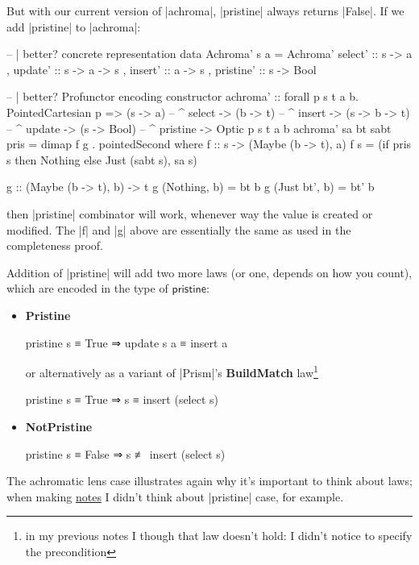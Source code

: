 \documentclass{article}
\begin{document}
But with our current version of |achroma|, |pristine| always returns |False|.
If we add |pristine| to |achroma|:

\begin{code}
-- | better? concrete representation
data Achroma' s a = Achroma'
    { select'   :: s -> a
    , update'   :: s -> a -> s
    , insert'   :: a -> s
    , pristine' :: s -> Bool
    }

-- | better? Profunctor encoding constructor
achroma'
    :: forall p s t a b. PointedCartesian p
    => (s -> a)       -- ^ select
    -> (b -> t)       -- ^ insert
    -> (s -> b -> t)  -- ^ update
    -> (s -> Bool)    -- ^ pristine
    -> Optic p s t a b
achroma' sa bt sabt pris
    = dimap f g
    . pointedSecond
  where
    f :: s -> (Maybe (b -> t), a)
    f s = (if pris s then Nothing else Just (sabt s), sa s)

    g :: (Maybe (b -> t), b) -> t
    g (Nothing,  b) = bt b
    g (Just bt', b) = bt' b
\end{code}

then |pristine| combinator will work, whenever way the value is created or modified.
The |f| and |g| above are essentially the same as used in the completeness proof.

Addition of |pristine| will add two more laws (or one, depends on how you count),
which are encoded in the type of $\mathsf{pristine}$:

\begin{itemize}
\item \textbf{Pristine}
\begin{code}
pristine s ≡ True ⇒ update s a ≡ insert a
\end{code}

or alternatively as a variant of |Prism|'s \textbf{BuildMatch} law\footnote{
in my previous notes I though that law doesn't hold: I didn't notice to specify the precondition}

\begin{code}
 pristine s ≡ True ⇒ s ≡ insert (select s)
\end{code}

\item \textbf{NotPristine}

\begin{code}
pristine s ≡ False ⇒ s ≢ insert (select s)
\end{code}
\end{itemize}

The achromatic lens case illustrates again why it's important to think about laws;
when making \href{2018-03-28-achromatic-lens.html}{notes} I didn't think about |pristine| case, for example.
\end{document}
